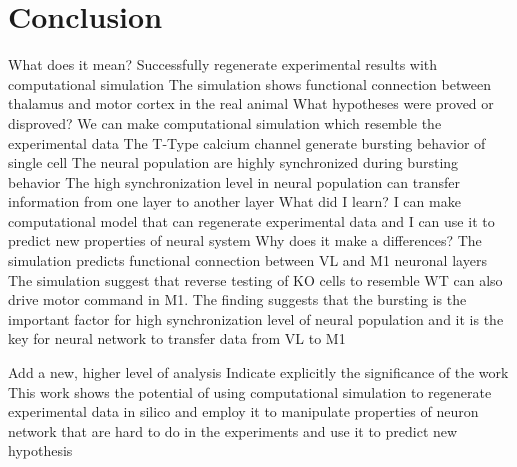 \chapter{Conclusion}

What does it mean?
Successfully regenerate experimental results with computational simulation
The simulation shows functional connection between thalamus and motor cortex in the real animal
What hypotheses were proved or disproved?
We can make computational simulation which resemble the experimental data
The T-Type calcium channel generate bursting behavior of single cell
The neural population are highly synchronized during bursting behavior
The high synchronization level in neural population can transfer information from one layer to another layer
What did I learn?
I can make computational model that can regenerate experimental data and I can use it to predict new properties of neural system
Why does it make a differences?
The simulation predicts functional connection between VL and M1 neuronal layers
The simulation suggest that reverse testing of KO cells to resemble WT can also drive motor command in M1. The finding suggests that the bursting is the important factor for high synchronization level of neural population and it is the key for neural network to transfer data from VL to M1

Add a new, higher level of analysis
Indicate explicitly the significance of the work
This work shows the potential of using computational simulation to regenerate experimental data in silico and employ it to manipulate properties of neuron network that are hard to do in the experiments and use it to predict new hypothesis
